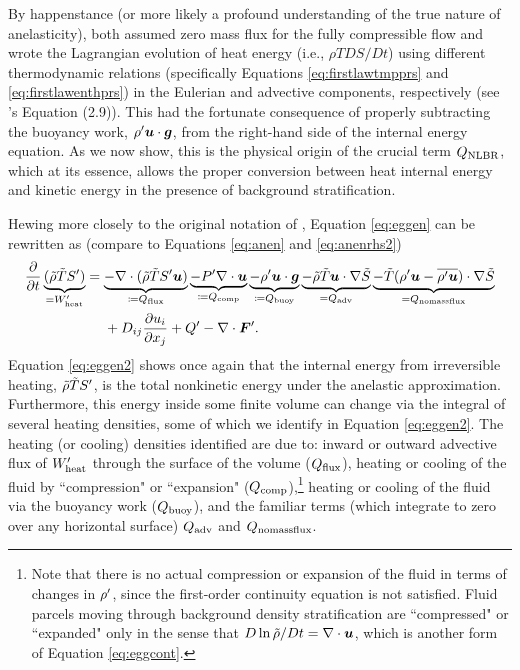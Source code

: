 \documentclass[12pt]{article}
\newcommand{\vecf}{\bm{F}}
\newcommand{\heatnlbr}{Q_{\rm NLBR}}
\newcommand{\heatnomassflux}{Q_{\rm nomassflux}}
\newcommand{\heatadv}{Q_{\rm adv}}
\newcommand{\heatcomp}{Q_{\rm comp}}
\newcommand{\heatbuoy}{Q_{\rm buoy}}
\newcommand{\heatfluxin}{Q_{\rm flux}}
\newcommand{\wpheat}{W^\prime_{\rm heat}}
\begin{document}
By happenstance (or more likely a profound understanding of the true nature of anelasticity), \citet{Gough1969} both assumed zero mass flux for the fully compressible flow and wrote the Lagrangian evolution of heat energy (i.e., $\rho T DS/Dt$) using different thermodynamic relations (specifically Equations \eqref{eq:firstlawtmpprs} and \eqref{eq:firstlawenthprs}) in the Eulerian and advective components, respectively (see \citet{Gough1969}'s Equation (2.9)). This had the fortunate consequence of properly subtracting the buoyancy work, ${\rho^\prime} \bm{u}\cdot \bm{g}$, from the right-hand side of the internal energy equation. As we now show, this is the physical origin of the crucial term $\heatnlbr$, which at its essence, allows the proper conversion between heat internal energy and kinetic energy in the presence of background stratification. 

Hewing more closely to the original notation of \citet{Gough1969}, Equation \eqref{eq:eggen} can be rewritten as (compare to Equations \eqref{eq:anen} and \eqref{eq:anenrhs2})
\begin{align}\label{eq:eggen2}
\pderiv{}{t}\underbrace{(\rhotilde\tmptilde\entrprime)}_{=\wpheat} &=\underbrace{-\Div(\rhotilde\tmptilde \entrprime\vecu)}_{\define\heatfluxin} \underbrace{-\prsprime\Div\vecu}_{\define\heatcomp} \underbrace{-\rhoprime \vecu\cdot \vecg}_{\define\heatbuoy}  \underbrace{- \rhotilde\tmptilde \ugrad \entrtilde}_{=\heatadv}\underbrace{- \tmptilde(\rhoprime \vecu-\overline{\rhoprime\vecu})\cdot\nabla\entrtilde}_{=\heatnomassflux}\nonumber\\
&\ \ \ \ +D_{ij}\pderiv{u_i}{x_j} + Q^\prime- \Div\vecf^\prime.
\end{align}
Equation \eqref{eq:eggen2} shows once again that the internal energy from irreversible heating, $\tilde{\rho}\tilde{T} {S^\prime}$, is the total nonkinetic energy under the anelastic approximation. Furthermore, this energy inside some finite volume can change via the integral of several heating densities, some of which we identify in Equation \eqref{eq:eggen2}. The heating (or cooling) densities identified are due to: inward or outward advective flux of $\wpheat$ through the surface of the volume ($\heatfluxin$), heating or cooling of the fluid by ``compression" or ``expansion" ($\heatcomp$),\footnote{Note that there is no actual compression or expansion of the fluid in terms of changes in ${\rho^\prime}$, since the first-order continuity equation is not satisfied. Fluid parcels moving through background density stratification are ``compressed" or ``expanded" only in the sense that $D\ln{\tilde{\rho}}/Dt=\nabla\cdot\bm{u}$, which is another form of Equation \eqref{eq:eggcont}.} heating or cooling of the fluid via the buoyancy work ($\heatbuoy$), and the familiar terms (which integrate to zero over any horizontal surface) $\heatadv$ and $\heatnomassflux$.
\end{document}
